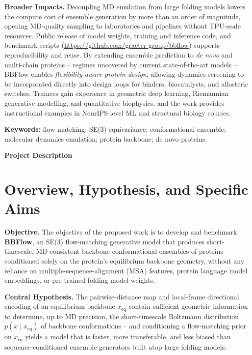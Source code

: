 \documentclass[12pt]{article}
\begin{document}
\noindent\textbf{Broader Impacts.}
Decoupling MD emulation from large folding models lowers the compute cost of
ensemble generation by more than an order of magnitude, opening MD-quality
sampling to laboratories and pipelines without TPU-scale resources. Public
release of model weights, training and inference code, and benchmark scripts
(\url{https://github.com/graeter-group/bbflow}) supports reproducibility and
reuse. By extending ensemble prediction to \emph{de novo} and multi-chain
proteins -- regimes uncovered by current state-of-the-art models -- BBFlow
enables \emph{flexibility-aware protein design}, allowing dynamics screening to
be incorporated directly into design loops for binders, biocatalysts, and
allosteric switches. Trainees gain experience in geometric deep learning,
Riemannian generative modelling, and quantitative biophysics, and the work
provides instructional examples in NeurIPS-level ML and structural biology
courses.

\textbf{Keywords:} flow matching; SE(3) equivariance; conformational ensemble;
molecular dynamics emulation; protein backbone; de novo proteins.

\newpage

\begin{center}
  {\large\bfseries Project Description}
\end{center}

\section{Overview, Hypothesis, and Specific Aims}

\noindent\textbf{Objective.} The objective of the proposed work is to develop and
benchmark \textbf{BBFlow}, an SE(3) flow-matching generative model that produces
short-timescale, MD-consistent backbone conformational ensembles of proteins
conditioned solely on the protein's equilibrium backbone geometry, without any
reliance on multiple-sequence-alignment (MSA) features, protein language model
embeddings, or pre-trained folding-model weights.

\noindent\textbf{Central Hypothesis.} The pairwise-distance map and local-frame
directional encoding of an equilibrium backbone $x_{\mathrm{eq}}$ contain
sufficient geometric information to determine, up to MD precision, the
short-timescale Boltzmann distribution $p(x \mid x_{\mathrm{eq}})$ of backbone
conformations -- and conditioning a flow-matching prior on $x_{\mathrm{eq}}$
yields a model that is faster, more transferable, and less biased than
sequence-conditioned ensemble generators built atop large folding models.
\end{document}
